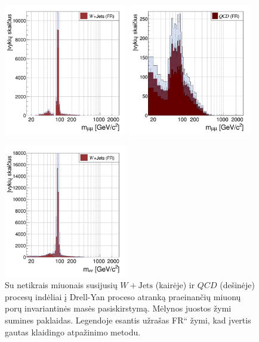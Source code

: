 \documentclass[a4paper, 12pt, oneside]{article}
\newcommand{\WJets}{W\! +\!\mathrm{Jets}}
\newcommand{\ltq}[1]{{\quotedblbase{}#1\textquotedblleft{}}}
\newcommand{\QCD}{QC\! D}
\newlength\q
\begin{document}
\begin{figure}[!b]
	\RawFloats
	\includegraphics[width=0.48\textwidth]{Magistrinis/WJETest_mumu_os.png}
	\includegraphics[width=0.48\textwidth]{Magistrinis/QCDest_mumu_final.png}
	\caption{\label{fig:JETmumu}
		Su netikrais miuonais susijusių $\WJets$ (kairėje) ir $\QCD$ (dešinėje) procesų indėliai į Drell-Yan proceso
		atranką praeinančių miuonų porų invariantinės masės pasiskirstymą.
		Mėlynos juostos žymi sumines paklaidas.
		Legendoje esantis užrašas \ltq{FR} žymi, kad įvertis gautas klaidingo atpažinimo metodu.
	}	
	\vspace{1cm}
	\includegraphics[width=0.48\textwidth]{Magistrinis/WJETest_ee_os.png}

\end{figure}
\end{document}
